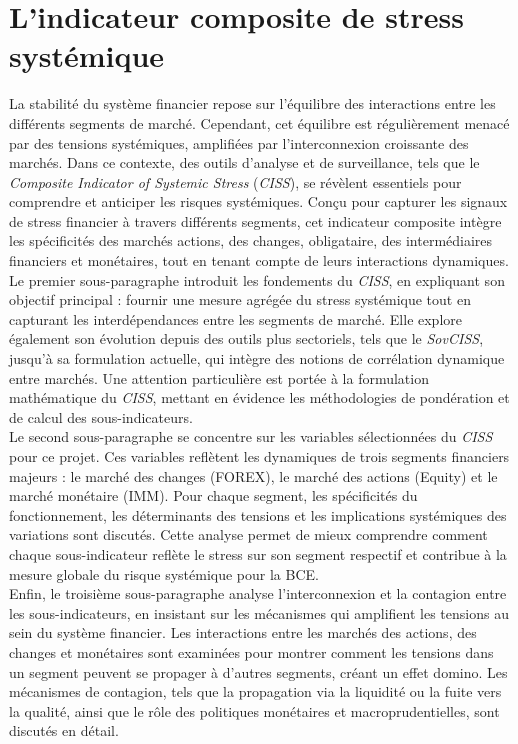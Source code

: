 \section{L'indicateur composite de stress systémique}

\begin{sloppypar}

La stabilité du système financier repose sur l'équilibre des interactions entre les différents segments de marché. Cependant, cet équilibre est régulièrement menacé par des tensions systémiques, amplifiées par l'interconnexion croissante des marchés. Dans ce contexte, des outils d'analyse et de surveillance, tels que le \textit{Composite Indicator of Systemic Stress} (\textit{CISS}), se révèlent essentiels pour comprendre et anticiper les risques systémiques. Conçu pour capturer les signaux de stress financier à travers différents segments, cet indicateur composite intègre les spécificités des marchés actions, des changes, obligataire, des intermédiaires financiers et monétaires, tout en tenant compte de leurs interactions dynamiques.\\

Le premier sous-paragraphe introduit les fondements du \textit{CISS}, en expliquant son objectif principal : fournir une mesure agrégée du stress systémique tout en capturant les interdépendances entre les segments de marché. Elle explore également son évolution depuis des outils plus sectoriels, tels que le \textit{SovCISS}, jusqu'à sa formulation actuelle, qui intègre des notions de corrélation dynamique entre marchés. Une attention particulière est portée à la formulation mathématique du \textit{CISS}, mettant en évidence les méthodologies de pondération et de calcul des sous-indicateurs.\\

Le second sous-paragraphe se concentre sur les variables sélectionnées du \textit{CISS} pour ce projet. Ces variables reflètent les dynamiques de trois segments financiers majeurs : le marché des changes (FOREX), le marché des actions (Equity) et le marché monétaire (IMM). Pour chaque segment, les spécificités du fonctionnement, les déterminants des tensions et les implications systémiques des variations sont discutés. Cette analyse permet de mieux comprendre comment chaque sous-indicateur reflète le stress sur son segment respectif et contribue à la mesure globale du risque systémique pour la BCE.\\

Enfin, le troisième sous-paragraphe analyse l'interconnexion et la contagion entre les sous-indicateurs, en insistant sur les mécanismes qui amplifient les tensions au sein du système financier. Les interactions entre les marchés des actions, des changes et monétaires sont examinées pour montrer comment les tensions dans un segment peuvent se propager à d'autres segments, créant un effet domino. Les mécanismes de contagion, tels que la propagation via la liquidité ou la fuite vers la qualité, ainsi que le rôle des politiques monétaires et macroprudentielles, sont discutés en détail.


\end{sloppypar}
